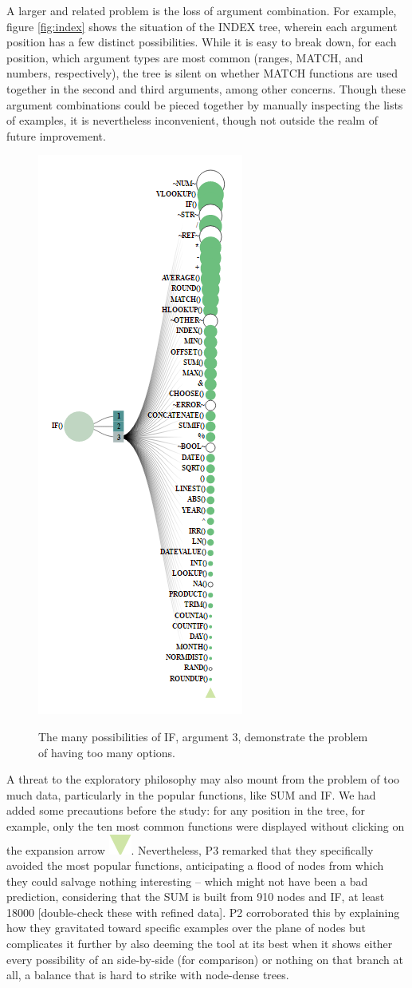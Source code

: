 \documentclass[conference]{IEEEtran}
\begin{document}
	A larger and related problem is the loss of argument combination. For example,
	figure \ref{fig:index} shows the situation of the INDEX tree, wherein each
	argument position has a few distinct possibilities. While it is easy to break
	down, for each position, which argument types are most common (ranges, MATCH,
	and numbers, respectively), the tree is silent on whether MATCH functions are
	used together in the second and third arguments, among other concerns. Though
	these argument combinations could be pieced together by manually inspecting the
	lists of examples, it is nevertheless inconvenient, though not outside the
	realm of future improvement.
	
	\begin{figure} 
		\centering 
		\includegraphics[width=.25\textwidth]{longIF} 
		\label{fig:longif}
		\caption{The many possibilities of IF, argument 3, demonstrate the problem of
			having too many options.} 
	\end{figure}
	
	A threat to the exploratory philosophy may also mount from the problem of too
	much data, particularly in the popular functions, like SUM and IF. We had added
	some precautions before the study: for any position in the tree, for example,
	only the ten most common functions were displayed without clicking on the
	expansion arrow \includegraphics[scale=.35]{arrow}. Nevertheless, P3 remarked
	that they specifically avoided the most popular functions, anticipating a flood
	of nodes from which they could salvage nothing interesting -- which might not
	have been a bad prediction, considering that the SUM is built from 910 nodes
	and IF, at least 18000 [double-check these with refined data]. P2 corroborated
	this by explaining how they gravitated toward specific examples over the plane
	of nodes but complicates it further by also deeming the tool at its best when
	it shows either every possibility of an side-by-side (for comparison) or
	nothing on that branch at all, a balance that is hard to strike with node-dense
	trees. \par
	
\end{document}
